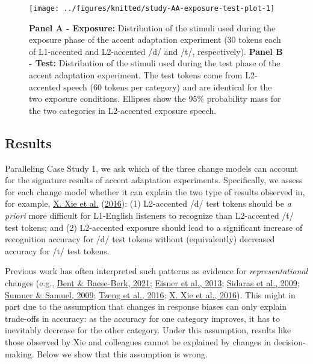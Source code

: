 \documentclass[
  11pt,
  english,
  man,floatsintext]{apa6}
\begin{document}
\begin{figure}

{\centering \texttt{[image: ../figures/knitted/study-AA-exposure-test-plot-1]} 

}

\caption{\textbf{Panel A - Exposure:} Distribution of the stimuli used during the exposure phase of the accent adaptation experiment (30 tokens each of L1-accented and L2-accented /d/ and /t/, respectively). \textbf{Panel B - Test:} Distribution of the stimuli used during the test phase of the accent adaptation experiment. The test tokens come from L2-accented speech (60 tokens per category) and are identical for the two exposure conditions. Ellipses show the 95\% probability mass for the two categories in L2-accented exposure speech.}\label{fig:study-AA-exposure-test-plot}
\end{figure}

\hypertarget{results-1}{%
\subsection{Results}\label{results-1}}

Paralleling Case Study 1, we ask which of the three change models can account for the signature results of accent adaptation experiments. Specifically, we assess for each change model whether it can explain the two type of results observed in, for example, \protect\hyperlink{ref-xie2016jep}{X. Xie et al.} (\protect\hyperlink{ref-xie2016jep}{2016}): (1) L2-accented /d/ test tokens should be \emph{a priori} more difficult for L1-English listeners to recognize than L2-accented /t/ test tokens; and (2) L2-accented exposure should lead to a significant increase of recognition accuracy for /d/ test tokens without (equivalently) decreased accuracy for /t/ test tokens.

Previous work has often interpreted such patterns as evidence for \emph{representational} changes (e.g., \protect\hyperlink{ref-bent-baeseberk2021}{Bent \& Baese-Berk, 2021}; \protect\hyperlink{ref-eisner2013}{Eisner et al., 2013}; \protect\hyperlink{ref-sidaras2009}{Sidaras et al., 2009}; \protect\hyperlink{ref-sumner2009}{Sumner \& Samuel, 2009}; \protect\hyperlink{ref-tzeng2016}{Tzeng et al., 2016}; \protect\hyperlink{ref-xie2016jep}{X. Xie et al., 2016}). This might in part due to the assumption that changes in response biases can only explain trade-offs in accuracy: as the accuracy for one category improves, it has to inevitably decrease for the other category. Under this assumption, results like those observed by Xie and colleagues cannot be explained by changes in decision-making. Below we show that this assumption is wrong.
\end{document}
